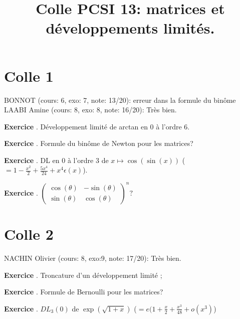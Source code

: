 \documentclass[10pt,a4paper]{article}
\title{Colle PCSI 13: matrices et développements limités.}
\newcounter{question}
\newcounter{exo}
\newenvironment{exo}{\vspace{0.5cm}\setcounter{question}{0}\addtocounter{exo}{1} \noindent \textbf{Exercice \theexo}. \normalsize }{\par}
\begin{document}
	\maketitle
	
	
	\section*{Colle 1}
	\setcounter{exo}{0}
	BONNOT (cours: 6, exo: 7, note: 13/20): erreur dans la formule du binôme
	LAABI Amine (cours: 8, exo: 8, note: 16/20): Très bien. \\
	
	\begin{exo}
		Développement limité de arctan en 0 à l'ordre 6. 
	\end{exo}
	
	\begin{exo}
		Formule du binôme de Newton pour les matrices?
	\end{exo}

	\begin{exo}
		DL en 0 à l'ordre 3 de $x \longmapsto \cos(\sin(x))$ ($= 1 - \frac{x^2}{2} + \frac{5x^4}{24} + x^4 \epsilon(x)$).
	\end{exo}	
	
	\begin{exo}
		$\begin{pmatrix}
			\cos(\theta) & -\sin(\theta) \\ 
			\sin(\theta) & \cos(\theta)
		\end{pmatrix}^n ?$
	\end{exo}
	
	\section*{Colle 2}
	\setcounter{exo}{0}
	NACHIN Olivier (cours: 8, exo:9, note: 17/20): Très bien.\\
	
	\begin{exo}
		 Troncature d'un développement limité ;
	\end{exo}

	\begin{exo}
		Formule de Bernoulli pour les matrices?
	\end{exo}

	\begin{exo}
		$DL_3(0)$ de $\exp(\sqrt{1+x})$ ($= e(1 + \frac{x}{2} + \frac{x^3}{48} + o(x^3)$)
	\end{exo}
\end{document}

